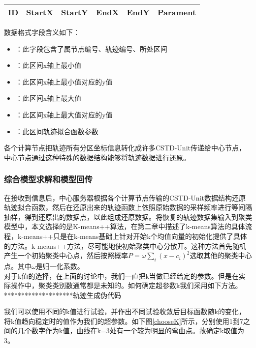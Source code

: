 \begin{tabular}{|c|c|c|c|c|c|}
\hline ID&StartX&StartY&EndX&EndY&Parament\\
\hline
\end{tabular}

数据格式字段含义如下：\\

\begin{itemize}
\item {}：此字段包含了属节点编号、轨迹编号、所处区间
\item {}：此区间x轴上最小值
\item {}：此区间x轴上最小值对应的y值
\item {}：此区间x轴上最大值
\item {}：此区间x轴上最大值对应的y值
\item {}：此区间轨迹拟合函数参数
\end{itemize}

各个计算节点把轨迹所有分区坐标信息转化成许多CSTD-Unit传递给中心节点，中心节点通过这种特殊的数据结构能够将轨迹数据进行还原。


\subsubsection{综合模型求解和模型回传}

在接收到信息后，中心服务器根据各个计算节点传输的CSTD-Unit数据结构还原轨迹拟合函数，然后在还原出来的轨迹函数上依照原始数据的采样频率进行等间隔抽样，得到还原出的数据点，以此组成还原数据。将恢复的轨迹数据集输入到聚类模型中，本文选择的是K-means++算法，在第二章中描述了k-means算法的具体流程，k-means++只是在k-means基础上针对开始k个均值向量的初始化提供了具体的方法。k-means++方法，尽可能地使初始聚类中心分散开。这种方法首先随机产生一个初始聚类中心点，然后按照概率$P=\omega \sum_i{\left( x-c_i \right) ^2}$选取其他的聚类中心点。其中$\omega$是归一化系数。\\
对于k值的选择，在上面的讨论中，我们一直把k当做已经给定的参数。但是在实际操作中，聚类类别数通常都是未知的。如何确定超参数k我们采用如下方法。\\


********************轨迹生成伪代码

我们可以使用不同的k值进行试验，并作出不同试验收敛后目标函数随k的变化，将k值趋向稳定时的值作为我们的超参数。如下图\ref{chooseK}所示，分别使用1到7之间的几个数字作为k值，曲线在k=3处有一个较为明显的弯曲点。故确定k取值为3。\\

